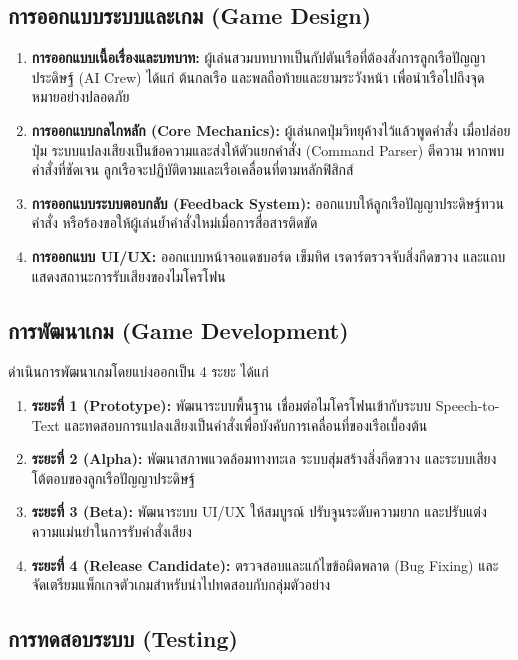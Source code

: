 \subsection{การออกแบบระบบและเกม (Game Design)}

\begin{enumerate}[label=(\arabic*)]
    \item \textbf{การออกแบบเนื้อเรื่องและบทบาท:} ผู้เล่นสวมบทบาทเป็นกัปตันเรือที่ต้องสั่งการลูกเรือปัญญาประดิษฐ์ (AI Crew) ได้แก่ ต้นกลเรือ และพลถือท้ายและยามระวังหน้า เพื่อนำเรือไปถึงจุดหมายอย่างปลอดภัย
    \item \textbf{การออกแบบกลไกหลัก (Core Mechanics):} ผู้เล่นกดปุ่มวิทยุค้างไว้แล้วพูดคำสั่ง เมื่อปล่อยปุ่ม ระบบแปลงเสียงเป็นข้อความและส่งให้ตัวแยกคำสั่ง (Command Parser) ตีความ หากพบคำสั่งที่ชัดเจน ลูกเรือจะปฏิบัติตามและเรือเคลื่อนที่ตามหลักฟิสิกส์
    \item \textbf{การออกแบบระบบตอบกลับ (Feedback System):} ออกแบบให้ลูกเรือปัญญาประดิษฐ์ทวนคำสั่ง หรือร้องขอให้ผู้เล่นย้ำคำสั่งใหม่เมื่อการสื่อสารติดขัด
    \item \textbf{การออกแบบ UI/UX:} ออกแบบหน้าจอแดชบอร์ด เข็มทิศ เรดาร์ตรวจจับสิ่งกีดขวาง และแถบแสดงสถานะการรับเสียงของไมโครโฟน
\end{enumerate}

\subsection{การพัฒนาเกม (Game Development)}

ดำเนินการพัฒนาเกมโดยแบ่งออกเป็น 4 ระยะ ได้แก่

\begin{enumerate}[label=(\arabic*)]
    \item \textbf{ระยะที่ 1 (Prototype):} พัฒนาระบบพื้นฐาน เชื่อมต่อไมโครโฟนเข้ากับระบบ Speech-to-Text และทดสอบการแปลงเสียงเป็นคำสั่งเพื่อบังคับการเคลื่อนที่ของเรือเบื้องต้น
    \item \textbf{ระยะที่ 2 (Alpha):} พัฒนาสภาพแวดล้อมทางทะเล ระบบสุ่มสร้างสิ่งกีดขวาง และระบบเสียงโต้ตอบของลูกเรือปัญญาประดิษฐ์
    \item \textbf{ระยะที่ 3 (Beta):} พัฒนาระบบ UI/UX ให้สมบูรณ์ ปรับจูนระดับความยาก และปรับแต่งความแม่นยำในการรับคำสั่งเสียง
    \item \textbf{ระยะที่ 4 (Release Candidate):} ตรวจสอบและแก้ไขข้อผิดพลาด (Bug Fixing) และจัดเตรียมแพ็กเกจตัวเกมสำหรับนำไปทดสอบกับกลุ่มตัวอย่าง
\end{enumerate}

\subsection{การทดสอบระบบ (Testing)}

